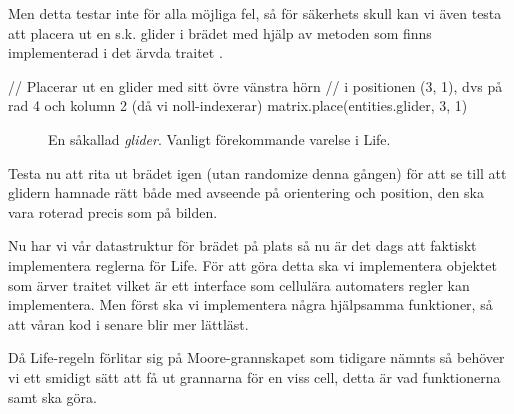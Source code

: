         Men detta testar inte för alla möjliga fel, så för säkerhets skull kan vi även testa att placera ut en s.k. glider i brädet med hjälp av metoden  som finns implementerad i det ärvda traitet .

\begin{Code}
// Placerar ut en glider med sitt övre vänstra hörn
// i positionen (3, 1), dvs på rad 4 och kolumn 2 (då vi noll-indexerar)
matrix.place(entities.glider, 3, 1)
\end{Code}

\begin{figure}[h]
  \begin{center}
  \end{center}
  \caption{En såkallad \textit{glider}. Vanligt förekommande varelse i Life.}
\end{figure}

        Testa nu att rita ut brädet igen (utan randomize denna gången) för att se till att glidern hamnade rätt både med avseende på orientering och position, den ska vara roterad precis som på bilden.


    
    Nu har vi vår datastruktur för brädet på plats så nu är det dags att faktiskt implementera reglerna för Life. För att göra detta ska vi implementera objektet  som ärver traitet  vilket är ett interface som cellulära automaters regler kan implementera. Men först ska vi implementera några hjälpsamma funktioner, så att våran kod i  senare blir mer lättläst.
    
        
        Då Life-regeln förlitar sig på Moore-grannskapet som tidigare nämnts så behöver vi ett smidigt sätt att få ut grannarna för en viss cell, detta är vad funktionerna  samt  ska göra.
        
